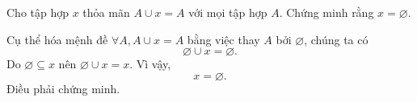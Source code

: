 \exercise Cho tập hợp $x$ thỏa mãn $A \cup x = A$ với mọi tập hợp $A$. Chứng minh rằng $x = \varnothing$.

\solution

Cụ thể hóa mệnh đề $\forall A, A \cup x = A$ bằng việc thay $A$ bởi $\varnothing$, chúng ta có
\begin{equation*}
   \varnothing \cup x = \varnothing.
\end{equation*}
Do $\varnothing \subseteq x$ nên $\varnothing \cup x = x$. Vì vậy, 
\begin{equation*}
   x = \varnothing.
\end{equation*}
Điều phải chứng minh.